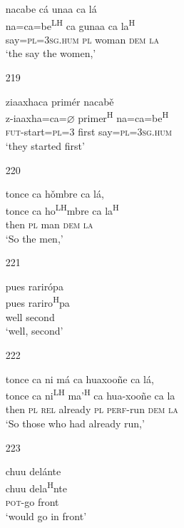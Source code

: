 \begin{itemize}
\glll   nacabe c\'{a} unaa ca l\'{a} \\
na=ca=be\textsuperscript{LH} ca gunaa ca la\textsuperscript{H} \\
say=\textsc{pl}=\textsc{3sg.hum} \textsc{pl} woman \textsc{dem} \textsc{la} \\
\glt `the say the women,'
 


\item[219]
 
\glll   ziaaxhaca prim\'{e}r nacab\v{e} \\
z-iaaxha=ca=$\varnothing$ primer\textsuperscript{H} na=ca=be\textsuperscript{H} \\
\textsc{fut}-start=\textsc{pl}=\textsc{3} first say=\textsc{pl}=\textsc{3sg.hum}  \\
\glt `they started first'
 



\item[220]
 
\glll   tonce ca h\v{o}mbre ca l\'{a}, \\
 tonce ca ho\textsuperscript{LH}mbre ca la\textsuperscript{H} \\
 then \textsc{pl} man \textsc{dem} \textsc{la} \\
\glt `So the men,'
 


\item[221]
 
\glll   pues rarir\'{o}pa \\
pues rariro\textsuperscript{H}pa \\
 well second \\
\glt `well, second'
 


\item[222]
 
\glll   tonce ca ni m\'{a} ca huaxoo\~{n}e ca l\'{a}, \\
  tonce ca ni\textsuperscript{LH} ma'\textsuperscript{H} ca hua-xoo\~{n}e ca la \\
  then \textsc{pl} \textsc{rel} already \textsc{pl} \textsc{perf}-run \textsc{dem} \textsc{la} \\
\glt `So those who had already run,'
 


\item[223]
 
\glll   chuu del\'{a}nte  \\
  chuu dela\textsuperscript{H}nte  \\
    \textsc{pot}-go front \\
\glt `would go in front'
 



\end{itemize}
